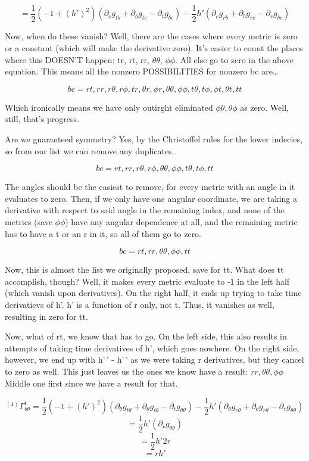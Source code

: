 \documentclass[landscape,letterpaper,10pt,english]{article}
\begin{document}
\[  = \frac12 (-1+(h')^2) (\partial_c g_{tb} + \partial_b g_{tc} - \partial_t g_{bc}) - \frac12 h'(\partial_c g_{rb} + \partial_b g_{rc} - \partial_r g_{bc}) \]

    Now, when do these vanish? Well, there are the cases where every metric
is zero or a constant (which will make the derivative zero). It's easier
to count the places where this DOESN'T happen: tr, rt, rr,
\(\theta\theta\), \(\phi\phi\). All else go to zero in the above
equation. This means all the nonzero POSSIBILITIES for nonzero bc
are\ldots{}

\[ bc = rt, rr, r\theta, r\phi, tr, \theta r, \phi r, \theta\theta, \phi\phi, t \theta, t \phi, \phi t, \theta t, tt \]

    Which ironically means we have only outirght eliminated
\(\phi\theta, \theta\phi\) as zero. Well, still, that's progress.

Are we guaranteed symmetry? Yes, by the Christoffel rules for the lower
indecies, so from our list we can remove any duplicates.

\[ bc = rt, rr, r\theta, r\phi, \theta\theta, \phi\phi, t \theta, t \phi, tt \]

The angles should be the easiest to remove, for every metric with an
angle in it evaluates to zero. Then, if we only have one angular
coordinate, we are taking a derivative with respect to said angle in the
remaining index, and none of the metrics (save \(\phi\phi\)) have any
angular dependence at all, and the remaining metric has to have a t or
an r in it, so all of them go to zero.

\[ bc = rt, rr, \theta\theta, \phi\phi, tt \]

    Now, this is almost the list we originally proposed, save for tt. What
does tt accomplish, though? Well, it makes every metric evaluate to -1
in the left half (which vanish upon derivatives). On the right half, it
ends up trying to take time derivatievs of h'. h' is a function of r
only, not t. Thus, it vanishes as well, resulting in zero for tt.

    Now, what of rt, we know that has to go. On the left side, this also
results in attempts of taking time derivatives of h', which goes
nowhere. On the right side, however, we end up with h'\,' - h'\,' as we
were taking r derivatives, but they cancel to zero as well. This just
leaves us the ones we know have a result: \(rr, \theta\theta, \phi\phi\)
Middle one first since we have a result for that.

\[ {}^{(4)}\Gamma^t_{\theta\theta} = \frac12 (-1+(h')^2) (\partial_\theta g_{t\theta} + \partial_\theta g_{t\theta} - \partial_t g_{\theta\theta}) - \frac12 h'(\partial_\theta g_{r\theta} + \partial_\theta g_{r\theta} - \partial_r g_{\theta\theta}) \]
\[  = \frac12 h'( \partial_r g_{\theta\theta}) \] \[  = \frac12 h' 2r \]
\[ = rh' \]
\end{document}

